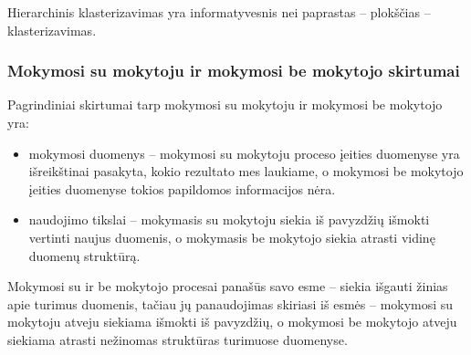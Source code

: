 Hierarchinis klasterizavimas yra informatyvesnis nei paprastas -- plokščias -- klasterizavimas.

\subsubsection{Mokymosi su mokytoju ir mokymosi be mokytojo skirtumai}

 Pagrindiniai skirtumai tarp mokymosi su mokytoju ir mokymosi be mokytojo yra:
\begin{itemize}
  \item mokymosi duomenys -- mokymosi su mokytoju proceso įeities duomenyse yra išreikštinai pasakyta, kokio rezultato mes laukiame, o mokymosi be mokytojo įeities duomenyse tokios papildomos informacijos nėra.
  \item  naudojimo tikslai -- mokymasis su mokytoju siekia iš pavyzdžių išmokti vertinti naujus duomenis, o mokymasis be mokytojo siekia atrasti vidinę duomenų struktūrą.
\end{itemize}
Mokymosi su ir be mokytojo procesai panašūs savo esme -- siekia išgauti žinias apie turimus duomenis, tačiau jų panaudojimas skiriasi iš esmės -- mokymosi su mokytoju atveju siekiama išmokti iš pavyzdžių, o mokymosi be mokytojo atveju siekiama atrasti nežinomas struktūras turimuose duomenyse.




